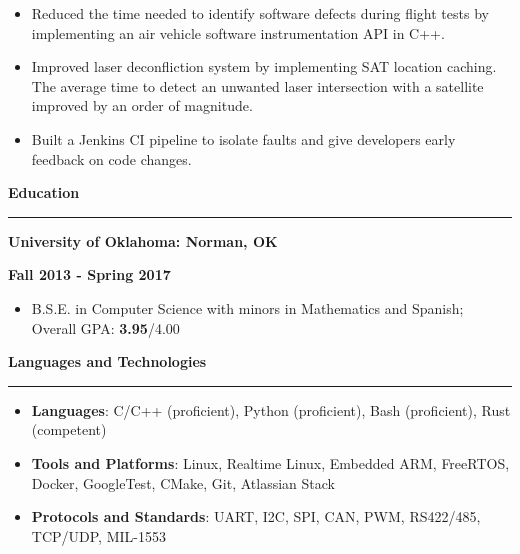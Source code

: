 \documentclass[11pt,letterpaper]{article}
\begin{document}
\begin{itemize}[noitemsep,topsep=0pt]
	\setlength\itemsep{0.2em}
	\item Reduced the time needed to identify software defects during flight
	      tests by implementing an air vehicle software instrumentation API in
	      C++.
	\item Improved laser deconfliction system by implementing SAT location
	      caching. The average time to detect an unwanted laser intersection
	      with a satellite improved by an order of magnitude.
	\item Built a Jenkins CI pipeline to isolate faults and give developers
	      early feedback on code changes.
\end{itemize}

\medskip

\begin{large}
	\textbf{Education}
\end{large}

\smallskip \hrule \medskip

\begin{minipage}[t]{0.5\textwidth}
	\begin{flushleft}
		\textbf{University of Oklahoma: Norman, OK}\\

	\end{flushleft}
\end{minipage}
\begin{minipage}[t]{0.46\textwidth}
	\begin{flushright}
		\textbf{Fall 2013 - Spring 2017}

	\end{flushright}
\end{minipage}
\begin{itemize}[topsep=0pt]
	\setlength\itemsep{0.2em}
	\item B.S.E. in Computer Science with minors in Mathematics and Spanish;
	      Overall GPA: \textbf{3.95}/{4.00}
\end{itemize}

\medskip

\begin{large}
	\textbf{Languages and Technologies}
\end{large}

\smallskip \hrule \medskip

\begin{itemize}[topsep=0pt]
	\setlength\itemsep{0.2em}
	\item \textbf{Languages}: C/C++ (proficient),
	      Python (proficient),
	      Bash (proficient),
	      Rust (competent)
	\item \textbf{Tools and Platforms}: 
        Linux,
	      Realtime Linux,
	      Embedded ARM,
	      FreeRTOS,
	      Docker,
	      GoogleTest,
	      CMake,
	      Git,
	      Atlassian Stack
	\item \textbf{Protocols and Standards}: 
        UART,
	      I2C,
	      SPI,
	      CAN,
	      PWM,
	      RS422/485,
	      TCP/UDP,
	      MIL-1553
\end{itemize}
\end{document}
